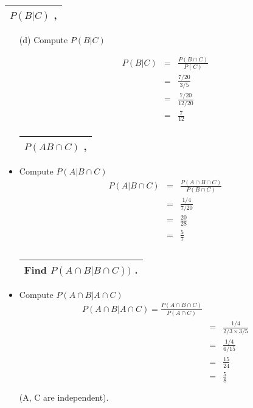 \documentclass[a4paper,12pt]{article}
\begin{document}
\newpage
\begin{table}[ht!]
 \centering
 \begin{tabular}{|p{15cm}|}
 \hline
\noindent 
$P (B | C)$ ,
\\ \hline
  \end{tabular}
\end{table}
\begin{itemize}
\item[(d)] Compute $P (B | C)$

\begin{eqnarray*}
P (B | C) &=& \frac{P( B \cap C)}{P (C)} \\ &=& \frac{7/20}{3/5}\\ &=& \frac{7/20}{12/20} \\ &=& \frac{7}{12} \\\end{eqnarray*}
\newpage
\begin{table}[ht!]
 \centering
 \begin{tabular}{|p{15cm}|}
 \hline
\noindent  $P( A B\cap C)$ ,
\\ \hline
 \end{tabular}
\end{table}

\item Compute $P (A | B  \cap C)$ 
\begin{eqnarray*}
P (A | B  \cap C) &=& \frac{P( A \cap B \cap C)}{P (B \cap C)} \\ 
&=& \frac{1/4}{7/20} \\ 
&=&  \frac{20}{28} \\ 
&=&  \frac{5}{7} \\
\\\end{eqnarray*}


\newpage
\begin{table}[ht!]
 \centering
 \begin{tabular}{|p{15cm}|}
 \hline
\noindent 

\large Find $P (A  \cap  B| B \cap  C))$ .
\\ \hline
  \end{tabular}
\end{table}


\item Compute $P (A \cap B | A \cap C)$ 
\begin{eqnarray*}
P (A \cap B | A \cap C) = \frac{P( A \cap B \cap C)}{P (A \cap C)} \\ 
&=&  \frac{1/4}{2/3 \times 3/5} \\ 
&=& \frac{1/4}{6/15} \\ 
&=&  \frac{15}{24} \\ 
&=&  \frac{5}{8} \\
\\\end{eqnarray*}
(A, C are independent).
\end{itemize}
\end{document}
